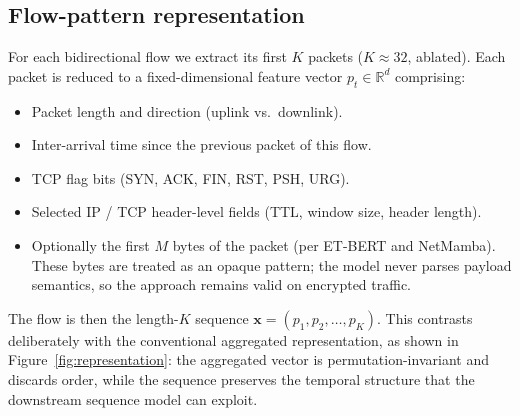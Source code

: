 \documentclass[11pt,a4paper]{article}
\begin{document}
\subsection{Flow-pattern representation}
For each bidirectional flow we extract its first $K$ packets ($K \approx 32$, ablated). Each packet is reduced to a fixed-dimensional feature vector $p_t \in \mathbb{R}^d$ comprising:
\begin{itemize}[leftmargin=*, itemsep=1pt]
  \item Packet length and direction (uplink vs.\ downlink).
  \item Inter-arrival time since the previous packet of this flow.
  \item TCP flag bits (SYN, ACK, FIN, RST, PSH, URG).
  \item Selected IP / TCP header-level fields (TTL, window size, header length).
  \item Optionally the first $M$ bytes of the packet (per ET-BERT and NetMamba). These bytes are treated as an opaque pattern; the model never parses payload semantics, so the approach remains valid on encrypted traffic.
\end{itemize}

The flow is then the length-$K$ sequence $\mathbf{x} = (p_1, p_2, \ldots, p_K)$. This contrasts deliberately with the conventional aggregated representation, as shown in Figure~\ref{fig:representation}: the aggregated vector is permutation-invariant and discards order, while the sequence preserves the temporal structure that the downstream sequence model can exploit.
\end{document}

